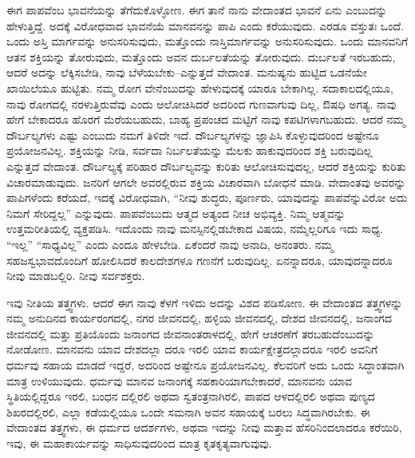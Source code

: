 ಈಗ ಪಾಪವೆಂಬ ಭಾವನೆಯನ್ನು ತೆಗೆದುಕೊಳ್ಳೋಣ. ಈಗ ತಾನೆ ನಾನು ವೇದಾಂತದ ಭಾವನೆ ಏನು ಎಂಬುದನ್ನು ಹೇಳುತ್ತಿದ್ದೆ. ಅದಕ್ಕೆ ವಿರೋಧವಾದ ಭಾವನೆಯೆ ಮಾನವನನ್ನು ಪಾಪಿ ಎಂದು ಕರೆಯುವುದು. ಎರಡೂ ವಸ್ತುತಃ ಒಂದೆ. ಒಂದು ಅಸ್ತಿ ಮಾರ್ಗವನ್ನು ಅನುಸರಿಸುವುದು, ಮತ್ತೊಂದು ನಾಸ್ತಿಮಾರ್ಗವನ್ನು ಅನುಸರಿಸುವುದು. ಒಂದು ಮಾನವನಿಗೆ ಆತನ ಶಕ್ತಿಯನ್ನು ತೋರುವುದು, ಮತ್ತೊಂದು ಅವನ ದುರ್ಬಲತೆಯನ್ನು ತೋರುವುದು. ದುರ್ಬಲತೆ ಇರಬಹುದು, ಆದರೆ ಅದನ್ನು ಲೆಕ್ಕಿಸಬೇಡಿ, ನಾವು ಬೆಳೆಯಬೇಕು–ಎನ್ನುತ್ತದೆ ವೇದಾಂತ. ಮನುಷ್ಯನು ಹುಟ್ಟಿದ ಒಡನೆಯೇ ಖಾಯಿಲೆಯೂ ಹುಟ್ಟಿತು. ನಮ್ಮ ರೋಗ ವೇನೆಂಬುದನ್ನು ಹೇಳುವುದಕ್ಕೆ ಯಾರೂ ಬೇಕಾಗಿಲ್ಲ. ಸದಾಕಾಲದಲ್ಲಿಯೂ, ನಾವು ರೋಗದಲ್ಲಿ ನರಳುತ್ತಿರುವೆವು ಎಂದು ಆಲೋಚಿಸಿದರೆ ಅದರಿಂದ ಗುಣವಾಗುವು ದಿಲ್ಲ, ಔಷಧಿ ಅಗತ್ಯ. ನಾವು ಹೇಗೆ ಬೇಕಾದರೂ ಹೊರಗೆ ಮೆರೆಯಬಹುದು, ಬಾಹ್ಯ ಪ್ರಪಂಚದ ಮಟ್ಟಿಗೆ ನಾವು ಕಪಟಿಗಳಾಗಬಹುದು. ಆದರೆ ನಮ್ಮ ದೌರ್ಬಲ್ಯಗಳು ಎಷ್ಟು ಎಂಬುದು ನಮಗೆ ತಿಳಿದೇ ಇದೆ. ದೌರ್ಬಲ್ಯಗಳನ್ನು ಜ್ಞಾಪಿಸಿ ಕೊಳ್ಳುವುದರಿಂದ ಅಷ್ಟೇನೂ ಪ್ರಯೋಜನವಿಲ್ಲ. ಶಕ್ತಿಯನ್ನು ನೀಡಿ, ಸರ್ವದಾ ನಿರ್ಬಲತೆಯನ್ನು ಮೆಲಕು ಹಾಕುವುದರಿಂದ ಶಕ್ತಿ ಬರುವುದಿಲ್ಲ ಎನ್ನುತ್ತದೆ ವೇದಾಂತ. ದೌರ್ಬಲ್ಯಕ್ಕೆ ಪರಿಹಾರ ದೌರ್ಬಲ್ಯವನ್ನು ಕುರಿತು ಆಲೋಚಿಸುವುದಲ್ಲ, ಆದರೆ ಶಕ್ತಿಯನ್ನು ಕುರಿತು ವಿಚಾರಮಾಡುವುದು. ಜನರಿಗೆ ಆಗಲೇ ಅವರಲ್ಲಿರುವ ಶಕ್ತಿಯ ವಿಚಾರವಾಗಿ ಬೋಧನೆ ಮಾಡಿ. ವೇದಾಂತವು ಅವರನ್ನು ಪಾಪಿಗಳೆಂದು ಕರೆಯದೆ, ಇದಕ್ಕೆ ವಿರೋಧವಾಗಿ, “ನೀವು ಶುದ್ಧರು, ಪೂರ್ಣರು, ಯಾವುದನ್ನು ಪಾಪವೆನ್ನುವಿರೋ ಅದು ನಿಮಗೆ ಸೇರಿದ್ದಲ್ಲ” ಎನ್ನುವುದು. ಪಾಪವೆಂಬುದು ಆತ್ಮದ ಅತ್ಯಂದ ನೀಚ ಅಭಿವ್ಯಕ್ತಿ. ನಿಮ್ಮ ಆತ್ಮವನ್ನು ಉತ್ತಮರೀತಿಯಲ್ಲಿ ವ್ಯಕ್ತಪಡಿಸಿ. ಇದೊಂದು ನಾವು ಮನಸ್ಸಿನಲ್ಲಿಡಬೇಕಾದ ವಿಷಯ, ನಮ್ಮೆಲ್ಲರಿಗೂ ಇದು ಸಾಧ್ಯ. “ಇಲ್ಲ” “ಸಾಧ್ಯವಿಲ್ಲ” ಎಂದು ಎಂದೂ ಹೇಳಬೇಡಿ. ಏಕೆಂದರೆ ನಾವು ಅನಾದಿ, ಅನಂತರು. ನಮ್ಮ ಸಹಜಸ್ವಭಾವದೊಂದಿಗೆ ಹೋಲಿಸಿದರೆ ಕಾಲದೇಶಗಳೂ ಗಣನೆಗೆ ಬರುವುದಿಲ್ಲ. ಏನನ್ನಾದರೂ, ಯಾವುದನ್ನಾದರೂ ನೀವು ಮಾಡಬಲ್ಲಿರಿ. ನೀವು ಸರ್ವಶಕ್ತರು.

ಇವು ನೀತಿಯ ತತ್ತ್ವಗಳು. ಆದರೆ ಈಗ ನಾವು ಕೆಳಗೆ ಇಳಿದು ಅದನ್ನು ವಿಶದ ಪಡಿಸೋಣ. ಈ ವೇದಾಂತದ ತತ್ತ್ವಗಳನ್ನು ನಮ್ಮ ಅನುದಿನದ ಕಾರ್ಯರಂಗದಲ್ಲಿ, ನಗರ ಜೀವನದಲ್ಲಿ, ಹಳ್ಳಿಯ ಜೀವನದಲ್ಲಿ, ದೇಶದ ಜೀವನದಲ್ಲಿ, ಜನಾಂಗದ ಜೀವನದಲ್ಲಿ ಮತ್ತು ಪ್ರತಿಯೊಂದು ಜನಾಂಗದ ಜೀವನಾಂತರಾಳದಲ್ಲಿ, ಹೇಗೆ ಆಚರಣೆಗೆ ತರಬಹುದೆಂಬುದನ್ನು ನೋಡೋಣ. ಮಾನವನು ಯಾವ ದೇಶದಲ್ಲಾ ದರೂ ಇರಲಿ ಯಾವ ಕಾರ್ಯಕ್ಷೇತ್ರದಲ್ಲಾದರೂ ಇರಲಿ ಅವನಿಗೆ ಧರ್ಮವು ಸಹಾಯ ಮಾಡದೆ ಇದ್ದರೆ, ಅದರಿಂದ ಅಷ್ಟೇನೂ ಪ್ರಯೋಜನವಿಲ್ಲ. ಕೆಲವರಿಗೆ ಅದು ಒಂದು ಸಿದ್ಧಾಂತವಾಗಿ ಮಾತ್ರ ಉಳಿಯುವುದು. ಧರ್ಮವು ಮಾನವ ಜನಾಂಗಕ್ಕೆ ಸಹಕಾರಿಯಾಗಬೇಕಾದರೆ, ಮಾನವನು ಯಾವ ಸ್ಥಿತಿಯಲ್ಲಿದ್ದರೂ ಇರಲಿ, ಬಂಧನ ದಲ್ಲಿರಲಿ ಅಥವಾ ಸ್ವತಂತ್ರನಾಗಿರಲಿ, ಪಾಪದ ಆಳದಲ್ಲಿರಲಿ ಅಥವಾ ಪುಣ್ಯದ ಶಿಖರದಲ್ಲಿರಲಿ, ಎಲ್ಲಾ ಕಡೆಯಲ್ಲಿಯೂ ಒಂದೇ ಸಮನಾಗಿ ಅವನ ಸಹಾಯಕ್ಕೆ ಬರಲು ಸಿದ್ಧವಾಗಿರಬೇಕು. ಈ ವೇದಾಂತದ ತತ್ತ್ವಗಳು, ಈ ಧರ್ಮದ ಆದರ್ಶಗಳು, ಅಥವಾ ಇದನ್ನು ನೀವು ಮತ್ತಾವ ಹೆಸರಿನಿಂದಲಾದರೂ ಕರೆಯಿರಿ, ಇವು, ಈ ಮಹಾಕಾರ್ಯವನ್ನು ಸಾಧಿಸುವುದರಿಂದ ಮಾತ್ರ ಕೃತಕೃತ್ಯವಾಗುವುವು.

